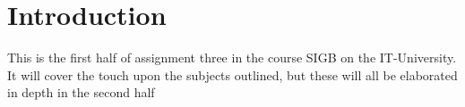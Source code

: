 \section{Introduction}

This is the first half of assignment three in the course SIGB on the
IT-University. It will cover the touch upon the subjects outlined, but these
will all be elaborated in depth in the second half
